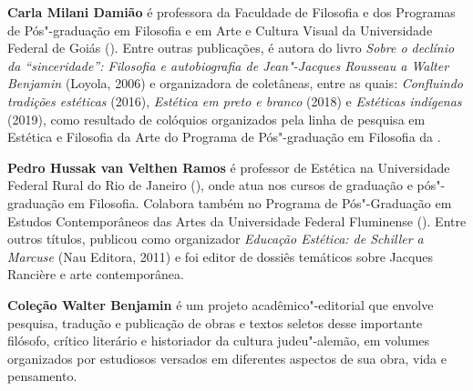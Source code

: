 
\textbf{Carla Milani Damião} é professora da Faculdade de Filosofia e dos Programas de Pós"-graduação em Filosofia e em Arte e Cultura Visual da Universidade Federal de Goiás ().
Entre outras publicações, é autora do livro \emph{Sobre o declínio da ``sinceridade'': Filosofia e
autobiografia de Jean"-Jacques Rousseau a Walter Benjamin} (Loyola, 2006) e organizadora de
coletâneas, entre as quais: \emph{Confluindo tradições estéticas} (2016), \emph{Estética em preto e branco} (2018) e \emph{Estéticas indígenas} (2019), como resultado de colóquios organizados pela linha de pesquisa em Estética e Filosofia da Arte do Programa de Pós"-graduação em Filosofia da .

\textbf{Pedro Hussak van Velthen Ramos} é professor de Estética na Universidade Federal Rural do
Rio de Janeiro (), onde atua nos cursos de graduação e pós"-graduação em Filosofia.
Colabora também no Programa de Pós"-Graduação em Estudos Contemporâneos das Artes da
Universidade Federal Fluminense (). Entre outros títulos, publicou como organizador \emph{Educação Estética: de Schiller a Marcuse} (Nau Editora, 2011) e foi editor de dossiês temáticos sobre Jacques Rancière e arte contemporânea.

\textbf{Coleção Walter Benjamin} é um projeto acadêmico"-editorial que envolve pesquisa, tradução e publicação de obras e textos seletos desse importante filósofo, crítico literário e historiador da cultura judeu"-alemão, em volumes organizados por estudiosos versados em diferentes aspectos de sua obra, vida e pensamento. 

